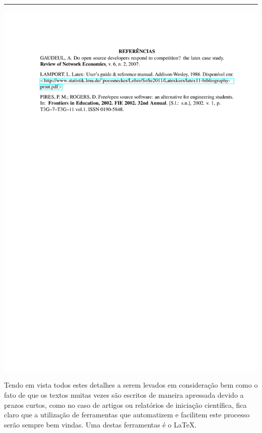 {\hrule
\noindent\includegraphics[trim=0 20cm 0 0cm,clip]{conteudo/intro_modelo_conferencias/references/utf-refs}

\clearpage}
\restoregeometry

Tendo em vista todos estes detalhes a serem levados em consideração bem como o fato de que os textos muitas vezes são escritos de maneira apressada devido a prazos curtos, como no caso de artigos ou relatórios de iniciação científica, fica claro que a utilização de ferramentas que automatizem e facilitem este processo serão sempre bem vindas. Uma destas ferramentas é o \LaTeX.



